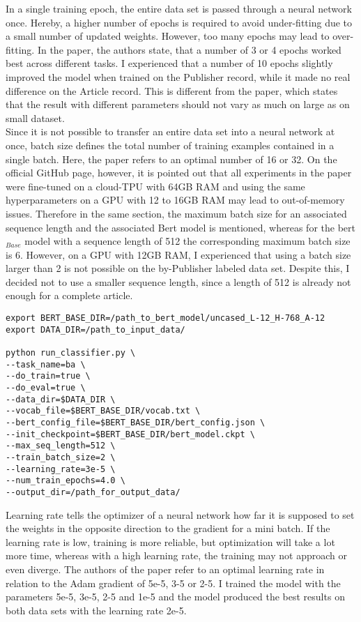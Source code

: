 \documentclass[a4paper, 11pt,titlepage,oneside,openany]{book}
\begin{document}
\indent In a single training epoch, the entire data set is passed through a neural network once. Hereby, a higher number of epochs is required to avoid under-fitting due to a small number of updated weights. However, too many epochs may lead to over-fitting. In the paper, the authors state, that a number of  3 or 4 epochs worked best across different tasks. I experienced that a number of 10 epochs slightly improved the model when trained on the Publisher record, while it made no real difference on the Article record. This is different from the paper, which states that the result with different parameters should not vary as much on large as on small dataset.  \\
\indent Since it is not possible to transfer an entire data set into a neural network at once, batch size defines the total number of training examples contained in a single batch. Here, the paper refers  to an optimal number of 16 or 32. On the official GitHub page, however, it is pointed out that all experiments in the paper were fine-tuned on a cloud-TPU with 64GB RAM and using the same hyperparameters  on a GPU with 12 to 16GB RAM may lead to out-of-memory issues. \newpage \noindent Therefore in the same section, the maximum batch size for an associated sequence length and the associated Bert model is mentioned, whereas for the \gls{bert}$_{Base}$ model with a sequence length of 512 the corresponding maximum batch size is 6. However, on
a GPU with 12GB RAM, I  experienced that using a batch size larger than 2 is not possible on the by-Publisher labeled data set. Despite this, I decided not to use a smaller sequence length, since a length of 512 is already not enough for a complete article. 
\begin{lstlisting}[caption=run\_classifier prompt with FLAGS]
export BERT_BASE_DIR=/path_to_bert_model/uncased_L-12_H-768_A-12
export DATA_DIR=/path_to_input_data/

python run_classifier.py \
--task_name=ba \
--do_train=true \
--do_eval=true \
--data_dir=$DATA_DIR \
--vocab_file=$BERT_BASE_DIR/vocab.txt \
--bert_config_file=$BERT_BASE_DIR/bert_config.json \
--init_checkpoint=$BERT_BASE_DIR/bert_model.ckpt \
--max_seq_length=512 \
--train_batch_size=2 \
--learning_rate=3e-5 \
--num_train_epochs=4.0 \
--output_dir=/path_for_output_data/
\end{lstlisting}
\indent Learning rate tells the optimizer of a neural network how far it is supposed to set the weights in the opposite direction to the gradient for a mini batch. If the learning rate is low, training is more reliable, but  optimization will take a lot more time, whereas with a high learning rate, the training may not approach or even diverge. The authors of the paper refer to an optimal learning rate in relation to the Adam gradient \cite{adam} of 5e-5, 3-5 or 2-5. I trained the model with the parameters 5e-5, 3e-5, 2-5 and 1e-5 and the model produced the best results on both data sets with the learning rate 2e-5. 
\end{document}

